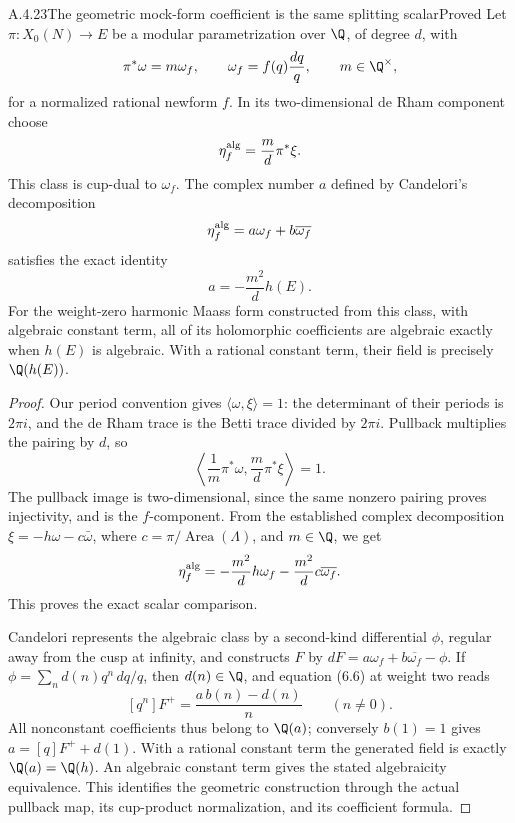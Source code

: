 \begin{result}{A.4.23}{The geometric mock-form coefficient is the same splitting scalar}{Proved}
Let $\pi:X_0(N)\to E$ be a modular parametrization over $\Q$, of degree $d$, with
\[
 \pi^*\omega=m\omega_f,\qquad
 \omega_f=f(q)\frac{dq}{q},\qquad m\in\Q^\times,
\]
for a normalized rational newform $f$. In its two-dimensional de Rham component choose
\[
 \eta_f^{\rm alg}=\frac m d\pi^*\xi.
\]
This class is cup-dual to $\omega_f$. The complex number $a$ defined by Candelori's decomposition
\[
 \eta_f^{\rm alg}=a\omega_f+b\overline{\omega_f}
\]
satisfies the exact identity
\[
 a=-\frac{m^2}{d}h(E).
\]
For the weight-zero harmonic Maass form constructed from this class, with algebraic constant term, all of its holomorphic coefficients are algebraic exactly when $h(E)$ is algebraic. With a rational constant term, their field is precisely $\Q(h(E))$.
\end{result}
\begin{proof}
Our period convention gives $\langle\omega,\xi\rangle=1$: the determinant of their periods is $2\pi i$, and the de Rham trace is the Betti trace divided by $2\pi i$. Pullback multiplies the pairing by $d$, so
\[
 \left\langle\frac1m\pi^*\omega,\frac m d\pi^*\xi\right\rangle=1.
\]
The pullback image is two-dimensional, since the same nonzero pairing proves injectivity, and is the $f$-component. From the established complex decomposition
$\xi=-h\omega-c\bar\omega$, where $c=\pi/\operatorname{Area}(\Lambda)$, and $m\in\Q$, we get
\[
 \eta_f^{\rm alg}
 =-\frac{m^2}{d}h\omega_f
 -\frac{m^2}{d}c\overline{\omega_f}.
\]
This proves the exact scalar comparison.

Candelori \cite[Section 6, equation (6.5), Proposition 6.2, and equation (6.6), pp.27--30]{EllCandelori2014} represents the algebraic class by a second-kind differential $\phi$, regular away from the cusp at infinity, and constructs $F$ by
$dF=a\omega_f+b\overline{\omega_f}-\phi$. If
$\phi=\sum_n d(n)q^n\,dq/q$, then $d(n)\in\Q$, and equation (6.6) at weight two reads
\[
 [q^n]F^+=\frac{a\,b(n)-d(n)}{n}\qquad(n\ne0).
\]
All nonconstant coefficients thus belong to $\Q(a)$; conversely $b(1)=1$ gives
$a=[q]F^++d(1)$. With a rational constant term the generated field is exactly $\Q(a)=\Q(h)$. An algebraic constant term gives the stated algebraicity equivalence. This identifies the geometric construction through the actual pullback map, its cup-product normalization, and its coefficient formula.
\end{proof}

